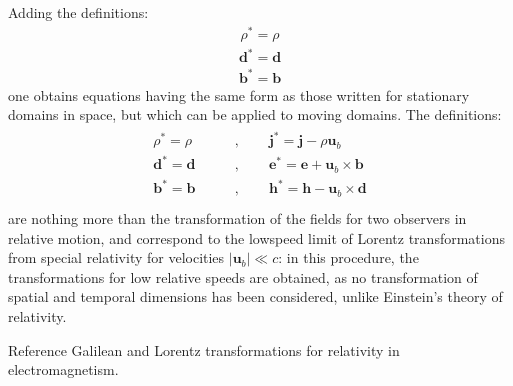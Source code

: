 \documentclass[letterpaper,10pt,italian]{jupyterBook}
\begin{document}
\sphinxAtStartPar
Adding the definitions:
\begin{equation*}
\begin{split}\rho^* = \rho\end{split}
\end{equation*}\begin{equation*}
\begin{split}\mathbf{d}^* = \mathbf{d}\end{split}
\end{equation*}\begin{equation*}
\begin{split}\mathbf{b}^* = \mathbf{b}\end{split}
\end{equation*}
\sphinxAtStartPar
one obtains equations having the same form as those written for stationary domains in space, but which can be applied to moving domains. The definitions:
\begin{equation*}
\begin{split}\begin{aligned}
\rho^* = \rho \qquad & , \qquad \mathbf{j}^* = \mathbf{j} - \rho \mathbf{u}_b \\
\mathbf{d}^* = \mathbf{d} \qquad & , \qquad \mathbf{e}^* = \mathbf{e} + \mathbf{u}_b \times \mathbf{b} \\
\mathbf{b}^* = \mathbf{b} \qquad & , \qquad \mathbf{h}^* = \mathbf{h} - \mathbf{u}_b \times \mathbf{d} \\
\end{aligned}\end{split}
\end{equation*}
\sphinxAtStartPar
are nothing more than the transformation of the fields for two observers in relative motion, and correspond to the low\sphinxhyphen{}speed limit of Lorentz transformations from special relativity for velocities \(|\mathbf{u}_b| \ll c\): in this procedure, the transformations for low relative speeds are obtained, as no transformation of spatial and temporal dimensions has been considered, unlike Einstein’s theory of relativity.

\sphinxAtStartPar
{} Reference Galilean and Lorentz transformations for relativity in electromagnetism.

\sphinxstepscope
\end{document}
